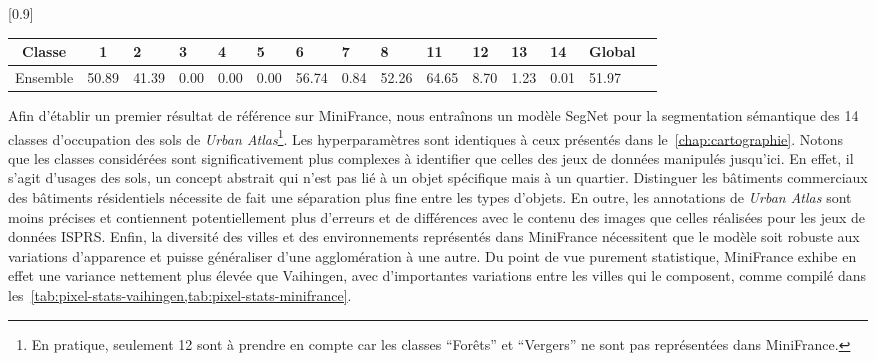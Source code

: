 \begin{table}[b]
	\label{tab:minifrance_results}
    \setlength\tabcolsep{8pt}
    \scalebox{0.9}[0.9]{
	\begin{tabularx}{1.1\textwidth}{c c Y Y Y Y Y Y Y Y Y Y Y Y Y}
		Classe & 1 & 2 & 3 & 4 & 5 & 6 & 7 & 8 & 11 & 12 & 13 & 14 & Global\\
		\midrule
		Ensemble &	50.89 & 41.39 & 0.00 & 0.00 & 0.00 & 56.74 & 0.84 & 52.26 & 64.65 & 8.70 & 1.23 & 0.01 & 51.97\\
		\bottomrule
	\end{tabularx}}
\end{table}

Afin d'établir un premier résultat de référence sur MiniFrance, nous entraînons un modèle SegNet pour la segmentation sémantique des 14 classes d'occupation des sols de \emph{Urban Atlas}\footnote{En pratique, seulement 12 sont à prendre en compte car les classes ``Forêts'' et ``Vergers'' ne sont pas représentées dans MiniFrance.}. Les hyperparamètres sont identiques à ceux présentés dans le~\cref{chap:cartographie}. Notons que les classes considérées sont significativement plus complexes à identifier que celles des jeux de données manipulés jusqu'ici. En effet, il s'agit d'usages des sols, un concept abstrait qui n'est pas lié à un objet spécifique mais à un quartier. Distinguer les bâtiments commerciaux des bâtiments résidentiels nécessite de fait une séparation plus fine entre les types d'objets. En outre, les annotations de \emph{Urban Atlas} sont moins précises et contiennent potentiellement plus d'erreurs et de différences avec le contenu des images que celles réalisées pour les jeux de données \gls{ISPRS}. Enfin, la diversité des villes et des environnements représentés dans MiniFrance nécessitent que le modèle soit robuste aux variations d'apparence et puisse généraliser d'une agglomération à une autre. Du point de vue purement statistique, MiniFrance exhibe en effet une variance nettement plus élevée que Vaihingen, avec d'importantes variations entre les villes qui le composent, comme compilé dans les~\cref{tab:pixel-stats-vaihingen,tab:pixel-stats-minifrance}.

